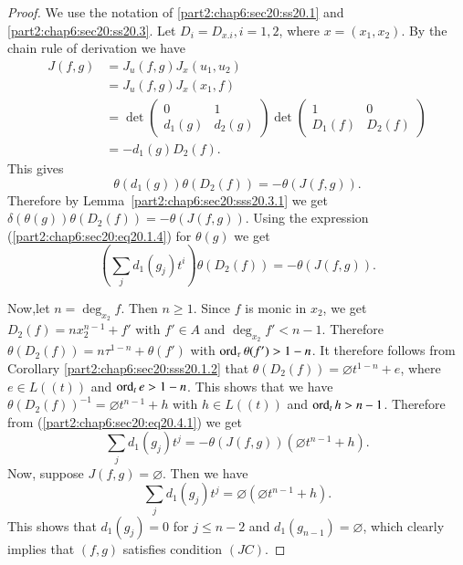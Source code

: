 \begin{proof}
  We use the notation of \ref{part2:chap6:sec20:ss20.1}
  and \ref{part2:chap6:sec20:ss20.3}. Let $D_i = D_{x. i}, i=1,2$,
  where $x= (x_1, x_2)$. By the chain rule of derivation we have
\begin{align*}
  J(f, g) & = J_u (f, g) J_x (u_1, u_2)\\
  & = J_u (f, g) J_x (x_1, f)\\
  & = \det \begin{pmatrix}
    0 & 1\\ 
d_1 (g) & d_2 (g)
  \end{pmatrix}\det
  \begin{pmatrix}
    1 & 0\\ 
D_1 (f) & D_2 (f)
  \end{pmatrix}\\
  & = -d_1(g) D_2 (f).
\end{align*}
This gives 
$$\theta (d_1 (g)) \theta (D_2 (f))= - \theta (J (f, g)).$$ 
Therefore by Lemma~\ref{part2:chap6:sec20:sss20.3.1} we get
$\delta (\theta (g)) \theta (D_2 (f))= - \theta (J (f, g))$. Using the
expression (\ref{part2:chap6:sec20:eq20.1.4}) for $\theta (g)$ we get 
\begin{equation*}
\left( \sum_j d_1 (g_j) t^i\right) \theta (D_2 (f))= -\theta (J (f,
g)).\tag{20.4.1}\label{part2:chap6:sec20:eq20.4.1} 
\end{equation*}

Now,\pageoriginale let $n= \deg_{x_2}f$. Then $n \geq 1$. Since $f$ is
monic in $x_2$, we get $D_2(f)= n x_2^{n-1}+ f'$ with $f' \in A$ and
$\deg_{x_2}f'< n-1$. Therefore $\theta (D_2 (f))= n \tau^{1-n}+ \theta
(f')$ with $\operatorname{ord}_\tau \theta (f') > 1-n$. It therefore follows from
Corollary \ref{part2:chap6:sec20:sss20.1.2} that $\theta (D_2 (f))=
\diameter t^{1-n}+e$, where $e \in L ((t))$ and $\operatorname{ord}_t e> 1-n$. This
shows that we have $\theta (D_2 (f))^{-1}= \diameter t^{n-1} + h$ with
$h \in L ((t))$ and $\operatorname{ord}_t h > n-1$. Therefore
from (\ref{part2:chap6:sec20:eq20.4.1})  we get
\begin{equation*}
  \sum_j d_1 (g_j)t^j =- \theta (J(f, g)) (\diameter t^{n-1} +
  h).\tag{20.4.2} \label{part2:chap6:sec20:eq20.4.2} 
\end{equation*}
Now, suppose $J(f, g)=\diameter$. Then we have
$$
\sum_j d_1 (g_j) t^j = \diameter (\diameter t^{n-1} + h).
$$
This shows that $d_1 (g_j)=0$ for $j \leq n-2$ and $d_1 (g_{n-1})=
\diameter$, which clearly implies that $(f, g)$ satisfies condition
$(JC)$.


\end{proof}
